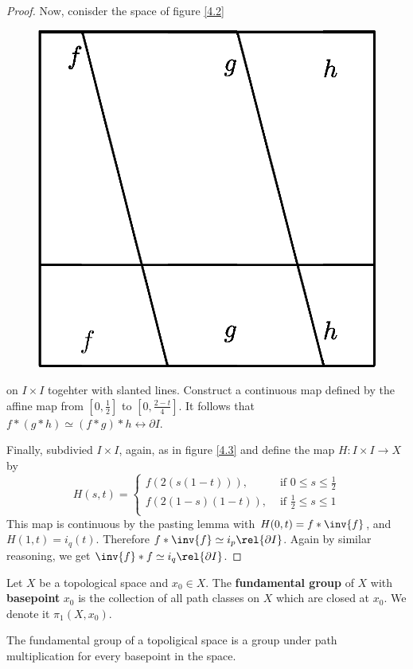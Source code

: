 \begin{proof}
    Now, conisder the space of figure \ref{4.2}
    \begin{figure}[h]
        \centering
        \includegraphics[scale=0.5]{Figures/chapter4/path_associativity.eps}
        \caption{}
        \label{fig_4.2}
    \end{figure}
    on $I \times I$ togehter with slanted lines. Construct a continuous map
    defined by the affine map from $[0,\frac{1}{2}]$ to $[0,\frac{2-t}{4}]$. It
    follows that $f \ast (g \ast h) \simeq (f \ast g) \ast h \rel{\partial{I}}$.

    Finally, subdivied $I \times I$, again, as in figure \ref{4.3} and define
    the map $H:I \times I \xrightarrow{} X$ by
    \begin{equation*}
       H(s,t)=\begin{cases}
           f(2(s(1-t))), & \text{ if } 0 \leq s \leq \frac{1}{2}    \\
           f(2(1-s)(1-t)), & \text{ if } \frac{1}{2} \leq s \leq 1  \\
            \end{cases}
    \end{equation*}
    This map is continuous by the pasting lemma with $H(0,t)=f \ast \inv{f}$,
    and $H(1,t)=i_q(t)$. Therefore $f \ast \inv{f} \simeq i_p
    \rel{\partial{I}}$. Again by similar reasoning, we get $\inv{f} \ast f
    \simeq i_q \rel{\partial{I}}$.
\end{proof}

\begin{definition}
    Let $X$ be a topological space and  $x_0 \in X$. The \textbf{fundamental
    group} of $X$ with \textbf{basepoint} $x_0$ is the collection of all path
    classes on $X$ which are closed at $x_0$. We denote it $\pi_1(X,x_0)$.
\end{definition}

\begin{theorem}\label{4.1.5}
    The fundamental group of a topoligical space is a group under path
    multiplication for every basepoint in the space.
\end{theorem}
